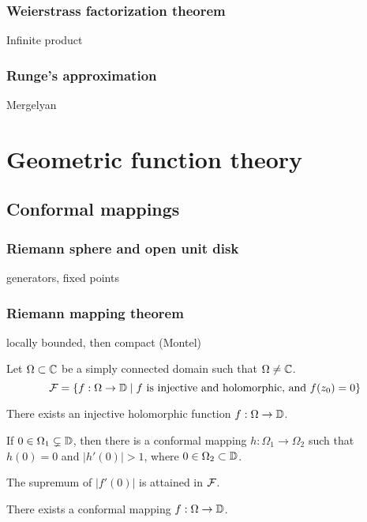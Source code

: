 \documentclass{../../large}
\begin{document}
\section{Weierstrass factorization theorem}
Infinite product

\section{Runge's approximation}
Mergelyan









\part{Geometric function theory}

\chapter{Conformal mappings}
\section{Riemann sphere and open unit disk}
\begin{prb}
\end{prb}
\begin{prb}
generators,
fixed points
\end{prb}
\begin{prb}
\end{prb}

\section{Riemann mapping theorem}


\begin{prb}
locally bounded, then compact (Montel)
\end{prb}

\begin{prb}
\end{prb}

\begin{prb}
Let $\Omega\subset\mathbb{C}$ be a simply connected domain such that $\Omega\ne\mathbb{C}$.
\[\mathcal{F}=\{f:\Omega\to\mathbb{D}\mid f\text{ is injective and holomorphic, and }f(z_0)=0\}\]
\begin{parts}
\item There exists an injective holomorphic function $f:\Omega\to\mathbb{D}$.
\item If $0\in\Omega_1\subsetneq\mathbb{D}$, then there is a conformal mapping $h:\Omega_1\to\Omega_2$ such that $h(0)=0$ and $|h'(0)|>1$, where $0\in\Omega_2\subset\mathbb{D}$.
\item The supremum of $|f'(0)|$ is attained in $\mathcal{F}$.
\item There exists a conformal mapping $f:\Omega\to\mathbb{D}$.
\end{parts}
\end{prb}
\end{document}
